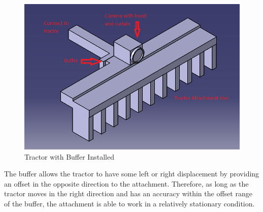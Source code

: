 \begin{figure}[ht!]
\begin{center}
\includegraphics[scale = 0.8]{pics/attachmentwithbuffer.png}
\caption{Tractor with Buffer Installed}
\end{center}
\end{figure} 

The buffer allows the tractor to have some left or right displacement by providing an offset in the opposite direction to the attachment. Therefore, as long as the tractor moves in the right direction and has an accuracy within the offset range of the buffer, the attachment is able to work in a relatively stationary condition. 

